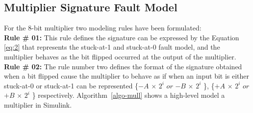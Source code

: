 \subsection{Multiplier Signature Fault Model}
For the 8-bit multiplier two modeling rules have been formulated: \\
\textbf{Rule \# 01:} This rule defines the signature can be expressed by the Equation \ref{eq:2} that represents the stuck-at-1 and stuck-at-0 fault model, and the multiplier behaves as the bit flipped occurred at the output of the multiplier.  \\
\textbf{Rule \# 02:} The rule number two defines the format of the signature obtained when a bit flipped cause the multiplier to behave as if when an input bit is either stuck-at-0 or stuck-at-1 can be represented \{$-$$A$ $\times$ $2^{i}$ $or$  $-$$B$ $\times$ $2^{i}$ \}, \{$+$$A$ $\times$ $2^{i}$ $or$  $+$$B$ $\times$ $2^{i}$ \} respectively. Algorithm~\ref{algo-mull} shows a high-level model a multiplier in Simulink.





